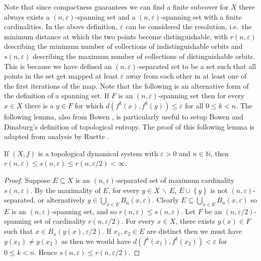 Note that since compactness guarantees we can find a finite subcover for $X$ there always exists a $(n, \varepsilon)$-spanning set and a $(n, \varepsilon)$-spanning set with a finite cardinalities. In the above definition, $\varepsilon$ can be considered the resolution, i.e.\ the minimum distance at which the two points become distinguishable, with $r(n, \varepsilon)$ describing the minimum number of collections of indistinguishable orbits and $s(n, \varepsilon)$ describing the maximum number of collections of distinguishable orbits. This is because we have defined an $(n, \varepsilon)$-separated set to be a set such that all points in the set get mapped at least $\varepsilon$ away from each other in at least one of the first iterations of the map. Note that the following is an alternative form of the definition of a spanning set. If $F$ is an $(n, \varepsilon)$-spanning set then for every $x \in X$ there is a $y \in F$ for which $d(f^k(x), f^k(y)) \leq \varepsilon$ for all $0 \leq k < n$. The following lemma, also from Bowen \cite{bowen}, is particularly useful to setup Bowen and Dinaburg's definition of topological entropy. The proof of this following lemma is adapted from analysis by Ruette \cite[§4.1]{ruette}.

\begin{lem} \label{lem:finite-maximum-minimum-spanning-separated}
    If $(X, f)$ is a topological dynamical system with $\varepsilon > 0$ and $n \in \mathbb{N}$, then $r(n, \varepsilon) \leq s(n, \varepsilon) \leq r(n, \varepsilon / 2) < \infty$.
    \begin{proof}
        Suppose $E \subseteq X$ is an $(n, \varepsilon)$-separated set of maximum cardinality $s(n, \varepsilon)$. By the maximality of $E$, for every $y \in X\, \backslash \, E$, $E \cup \left\lbrace y \right\rbrace$ is not $(n, \varepsilon)$-separated, or alternatively $y \in \bigcup_{x \in E}B_n(x, \varepsilon)$. Clearly $E \subseteq \bigcup_{x \in E}B_n(x, \varepsilon)$ so $E$ is an $(n, \varepsilon)$-spanning set, and so $r(n, \varepsilon) \leq s(n, \varepsilon)$. Let $F$ be an $(n, \varepsilon / 2)$-spanning set of cardinality $r(n, \varepsilon / 2)$. For every $x \in X$, there exists $y(x) \in F$ such that $x \in B_n(y(x), \varepsilon / 2)$. If $x_1, x_2 \in E$ are distinct then we must have $y(x_1) \neq y(x_2)$ as then we would have $d(f^k(x_1), f^k(x_2)) < \varepsilon$ for $0 \leq k < n$. Hence $s(n, \varepsilon) \leq r(n, \varepsilon / 2)$.
    \end{proof}
\end{lem}

